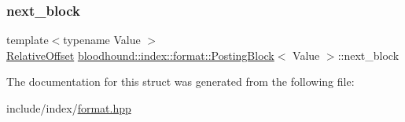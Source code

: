 \subsubsection{\texorpdfstring{next\+\_\+block}{next\_block}}
{\footnotesize\ttfamily template$<$typename Value $>$ \\
\hyperlink{structbloodhound_1_1RelativeOffset}{Relative\+Offset} \hyperlink{structbloodhound_1_1index_1_1format_1_1PostingBlock}{bloodhound\+::index\+::format\+::\+Posting\+Block}$<$ Value $>$\+::next\+\_\+block}



The documentation for this struct was generated from the following file\+:\begin{DoxyCompactItemize}
\item 
include/index/\hyperlink{format_8hpp}{format.\+hpp}\end{DoxyCompactItemize}
